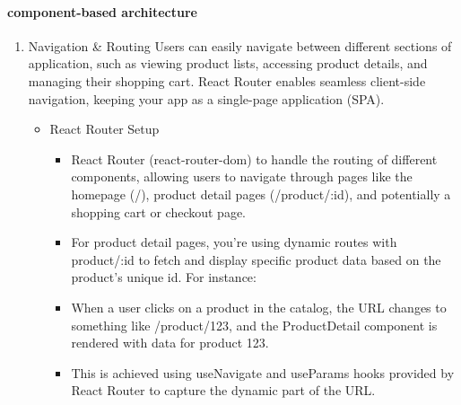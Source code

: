 \documentclass{llncs}
\begin{document}
\paragraph{component-based architecture}
\begin{enumerate}
    \item Navigation \& Routing 
    Users can easily navigate between different sections of application, such as viewing product lists, accessing product details, and managing their shopping cart. React Router enables seamless client-side navigation, keeping your app as a single-page application (SPA).
    \begin{itemize}
        \item React Router Setup 
        \begin{itemize}
            \item React Router (react-router-dom) to handle the routing of different components, allowing users to navigate through pages like the homepage (/), product detail pages (/product/:id), and potentially a shopping cart or checkout page.
            \item For product detail pages, you're using dynamic routes with product/:id to fetch and display specific product data based on the product’s unique id. For instance:
            \item When a user clicks on a product in the catalog, the URL changes to something like /product/123, and the ProductDetail component is rendered with data for product 123.
            \item This is achieved using useNavigate and useParams hooks provided by React Router to capture the dynamic part of the URL.
        \end{itemize}
        

\end{itemize}
\end{enumerate}
\end{document}
